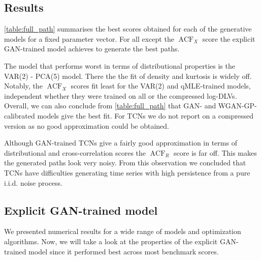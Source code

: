 \documentclass[]{article} %
\begin{document}
\subsection{Results}
\autoref{table:full_path} summarises the best scores obtained for each of the generative models for a fixed parameter vector. For all except the $\operatorname{ACF}_X$ score the explicit GAN-trained model achieves to generate the best paths. 



The model that performs worst in terms of distributional properties is the VAR(2) - PCA(5) model. There the the fit of density and kurtosis is widely off. Notably, the $\operatorname{ACF}_X$ scores fit least for the VAR(2) and qMLE-trained models, independent whether they were trained on all or the compressed log-DLVs. Overall, we can also conclude from \autoref{table:full_path} that GAN- and WGAN-GP-calibrated models give the best fit. For TCNs we do not report on a compressed version as no good approximation could be obtained.

Although GAN-trained TCNs give a fairly good approximation in terms of distributional and cross-correlation scores the $\operatorname{ACF}_R$ score is far off. This makes the generated paths look very noisy. From this observation we concluded that TCNs have difficulties generating time series with high persistence from a pure i.i.d. noise process.

\subsection{Explicit GAN-trained model}
We presented numerical results for a wide range of models and optimization algorithms. Now, we will take a look at the properties of the explicit GAN-trained model since it performed best across most benchmark scores. 
\end{document}
